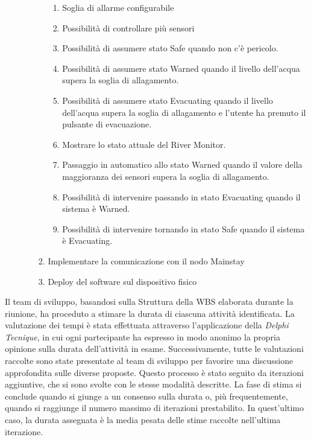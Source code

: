 \begin{enumerate}
\begin{enumerate}
\begin{enumerate}
                              \begin{enumerate}
                                  \item Soglia di allarme configurabile
                                  \item Possibilità di controllare più sensori
                                  \item Possibilità di assumere stato Safe quando non c'è pericolo.
                                  \item Possibilità di assumere stato Warned quando il livello dell'acqua supera la soglia di allagamento.
                                  \item Possibilità di assumere stato Evacuating quando il livello dell'acqua supera la soglia di allagamento e l'utente ha premuto il pulsante di evacuazione.
                                  \item Mostrare lo stato attuale del River Monitor.
                                  \item Passaggio in automatico allo stato Warned quando il valore della maggioranza dei sensori supera la soglia di allagamento.
                                  \item Possibilità di intervenire passando in stato Evacuating quando il sistema è Warned.
                                  \item Possibilità di intervenire tornando in stato Safe quando il sistema è Evacuating.
                              \end{enumerate}
                        \item Implementare la comunicazione con il nodo Mainstay
                        \item Deploy del software sul dispositivo fisico
                    \end{enumerate}
          \end{enumerate}
\end{enumerate}

Il team di sviluppo, basandosi sulla Struttura della WBS elaborata durante la riunione, ha proceduto a stimare la durata di ciascuna attività identificata. La valutazione dei tempi è stata effettuata attraverso l'applicazione della \textit{Delphi Tecnique}, in cui ogni partecipante ha espresso in modo anonimo la propria opinione sulla durata dell'attività in esame. Successivamente, tutte le valutazioni raccolte sono state presentate al team di sviluppo per favorire una discussione approfondita sulle diverse proposte. Questo processo è stato seguito da iterazioni aggiuntive, che si sono svolte con le stesse modalità descritte. La fase di stima si conclude quando si giunge a un consenso sulla durata o, più frequentemente, quando si raggiunge il numero massimo di iterazioni prestabilito. In quest'ultimo caso, la durata assegnata è la media pesata delle stime raccolte nell'ultima iterazione.

